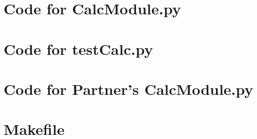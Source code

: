 \documentclass[12pt]{article}
\begin{document}
\noindent 

\newpage

\section{Code for CalcModule.py}

\noindent 

\newpage

\section{Code for testCalc.py}

\noindent 

\newpage

\section{Code for Partner's CalcModule.py}

\noindent 

\newpage

\section{Makefile}

\lstset{language=make}
\noindent 
\end{document}
